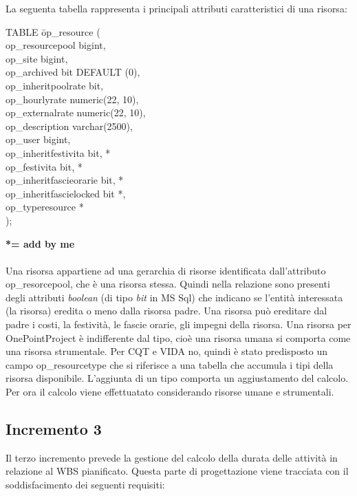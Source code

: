 La seguenta tabella rappresenta i principali attributi caratteristici di una risorsa:
\begin{tabbing}
TABLE \=op\_resource (\\
\>    op\_resourcepool bigint,\\
\>    op\_site bigint,\\
\>    op\_archived bit DEFAULT (0),\\
\>    op\_inheritpoolrate bit,\\
\>    op\_hourlyrate numeric(22, 10),\\
\>    op\_externalrate numeric(22, 10),\\
\>    op\_description varchar(2500),\\
\>    op\_user bigint,\\
\>    op\_inheritfestivita bit, *\\
\>    op\_festivita bit, *\\
\>    op\_inheritfascieorarie bit, *\\
\>    op\_inheritfascielocked bit *,\\
\>    op\_typeresource *\\
);
\end{tabbing}
\textbf{*= add by me} \\ \\
Una risorsa appartiene ad una gerarchia di risorse identificata dall\textquoteright{}attributo op\_resorcepool, che \`{e} una risorsa stessa. Quindi nella relazione sono presenti degli attributi \textit{boolean} (di tipo \textit{bit} in MS Sql) che indicano se l\textquoteright{}entit\`{a} interessata (la risorsa) eredita o meno dalla risorsa padre. Una risorsa pu\`{o} ereditare dal padre i costi, la festivit\`{a}, le fascie orarie, gli impegni della risorsa.
Una risorsa per OnePointProject \`{e} indifferente dal tipo, cio\`{e} una risorsa umana si comporta come una risorsa strumentale. Per CQT e VIDA no, quindi \`{e} stato predisposto un campo op\_resourcetype che si riferisce a una tabella che accumula i tipi della risorsa disponibile.
L\textquoteright{}aggiunta di un tipo comporta un aggiustamento del calcolo. Per ora il calcolo viene effettuatato considerando risorse umane e strumentali.

\subsection{Incremento 3}
Il terzo incremento prevede la gestione del calcolo della durata delle attivit\`{a} in relazione al WBS pianificato. Questa parte di progettazione viene tracciata con il soddisfacimento dei seguenti requisiti:

